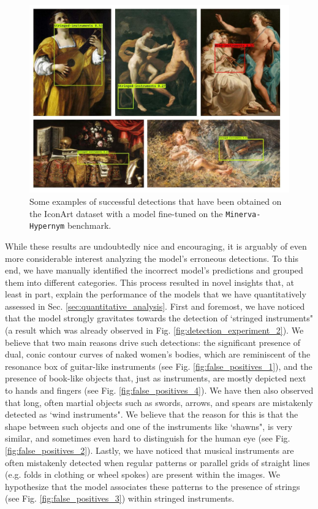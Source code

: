 \begin{figure}[ht!]
\centering
  \includegraphics[width=\linewidth]{./Images/Chapter05/wikiart_detections}
  \caption{Some examples of successful detections that have been obtained on the IconArt dataset with a model fine-tuned on the \texttt{Minerva-Hypernym} benchmark.}
  \label{fig:wikiart_detections}
\end{figure}

While these results are undoubtedly nice and encouraging, it is arguably of even more considerable interest analyzing the model's erroneous detections. To this end, we have manually identified the incorrect model's predictions and grouped them into different categories. This process resulted in novel insights that, at least in part, explain the performance of the models that we have quantitatively assessed in Sec. \ref{sec:quantitative_analysis}.
First and foremost, we have noticed that the model strongly gravitates towards the detection of `stringed instruments" (a result which was already observed in Fig. \ref{fig:detection_experiment_2}). We believe that two main reasons drive such detections: the significant presence of dual, conic contour curves of naked women's bodies, which are reminiscent of the resonance box of guitar-like instruments (see Fig. \ref{fig:false_positives_1}), and the presence of book-like objects that, just as instruments, are mostly depicted next to hands and fingers (see Fig. \ref{fig:false_positives_4}). We have then also observed that long, often martial objects such as swords, arrows, and spears are mistakenly detected as `wind instruments". We believe that the reason for this is that the shape between such objects and one of the instruments like `shawns", is very similar, and sometimes even hard to distinguish for the human eye (see Fig. \ref{fig:false_positives_2}).
Lastly, we have noticed that musical instruments are often mistakenly detected when regular patterns or parallel grids of straight lines (e.g. folds in clothing or wheel spokes) are present within the images. We hypothesize that the model associates these patterns to the presence of strings (see Fig. \ref{fig:false_positives_3}) within stringed instruments. 

